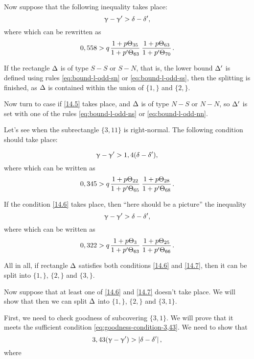 Now suppose that the following inequality takes place:
\begin{equation*}
	\upgamma - \upgamma' > \delta - \delta',
\end{equation*}
where
which can be rewritten as
\begin{equation}\label{14.5}
	0,558 > q \up{35}{63} \up{63}{70}.
\end{equation}

If the rectangle $\Delta$ is of type $S-S$ or $S-N$,
that is, the lower bound $\Delta'$ is defined using rules \ref{eq:bound-l-odd-sn} or \ref{eq:bound-l-odd-ss},
then the splitting is finished, as $\Delta$ is contained within the union of $\{1,\}$ and $\{2,\}$.

Now turn to case if \ref{14.5} takes place,
and $\Delta$ is of type $N-S$ or $N-N$,
so $\Delta'$ is set with one of the rules \ref{eq:bound-l-odd-ns} or \ref{eq:bound-l-odd-nn}.

Let's see when the subrectangle $\{3, 11\}$ is right-normal.
The following condition should take place:

\begin{equation*}
	\upgamma - \upgamma' > 1,4 (\delta - \delta'),
\end{equation*}
where
which can be written as
\begin{equation}\label{14.6}
	0,345 > q \up{22}{65} \up{28}{68}.
\end{equation}

If the condition \ref{14.6} takes place, then ``here should be a picture''
the inequality
\begin{equation*}
	\upgamma - \upgamma' > \delta - \delta',
\end{equation*}
where
which can be written as
\begin{equation}\label{14.7}
	0,322 > q \up{3}{63} \up{25}{66}.
\end{equation}

All in all, if rectangle $\Delta$ satisfies both conditions \ref{14.6} and \ref{14.7},
then it can be split into $\{1,\}$, $\{2,\}$ and $\{3,\}$.

Now suppose that at least one of \ref{14.6} and \ref{14.7} doesn't take place.
We will show that then we can split $\Delta$ into $\{1,\}$, $\{2,\}$ and $\{3,1\}$.

First, we need to check goodness of subcovering $\{3,1\}$.
We will prove that it meets the sufficient condition \ref{eq:goodness-condition-3,43}.
We need to show that
\begin{equation}\label{14.8}
	3,43 (\upgamma - \upgamma') > \left| \delta - \delta' \right|,
\end{equation}
where


